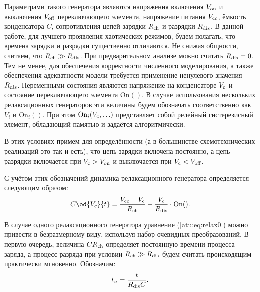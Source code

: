 
Параметрами такого генератора являются
напряжения включения $V_\mathrm{on}$ и выключения $V_\mathrm{off}$
переключающего элемента,
напряжение питания $V_\mathrm{cc}$,
ёмкость конденсатора $C$,
сопротивления цепей зарядки $R_\mathrm{ch}$
и разрядки $R_\mathrm{dis}$.
В данной работе, для лучшего проявления
хаотических режимов,
будем полагать, что времена зарядки и разрядки существенно отличаются.
Не снижая общности, считаем, что $R_\mathrm{ch} \gg R_\mathrm{dis} $.
При предварительном анализе можно считать $R_\mathrm{dis} = 0$.
Тем не менее, для обеспечения корректности численного моделирования,
а также обеспечения адекватности модели требуется применение ненулевого значения $R_\mathrm{dis}$.
Переменными состояния являются напряжение на конденсаторе $V_\mathrm{c}$
и состояние переключающего элемента $\mathrm{On}()$.
В случае использования нескольких релаксационных генераторов
эти величины будем обозначать соответственно как
$V_{i}$ и $ \mathrm{On}_{i}()$.
При этом  $ \mathrm{On}_{i}( V_\mathrm{c}, \ldots )$ представляет собой
релейный гистерезисный элемент, обладающий памятью и задаётся алгоритмически.


В этих условиях примем для определённости
(а в большинстве схемотехнических реализаций это так и есть),
что цепь зарядки включена постоянно, а цепь разрядки
включается при $V_\mathrm{c} > V_\mathrm{on} $ и выключается при
$V_\mathrm{c} < V_\mathrm{off}$.

С учётом этих обозначений динамика релаксационного генератора
определяется следующим образом:
%
\begin{equation}
  C \od{V_c}{t}
  =
  \frac{V\Tidx{cc} - V\Tidx{c}}{R\Tidx{ch}}
  - \frac{V\Tidx{c}}{R\Tidx{dis}} \cdot \mathrm{On}().
  \label{atu:eq:relax0}
\end{equation}

В случае одного релаксационного генератора
уравнение (\ref{atu:eq:relax0}) можно привести в безразмерному виду,
используя набор очевидных преобразований. В первую
очередь, величина $C R_\mathrm{ch}$ определяет
постоянную времени процесса заряда, а процесс
разряда при условии $R_\mathrm{ch} \gg R_\mathrm{dis} $ будем считать происходящим практически мгновенно.
Обозначим:
%
\begin{equation}
  t_u = \frac{t}{R_\mathrm{dis} C} .
  \label{atu:eq:t_u_relax}
\end{equation}

